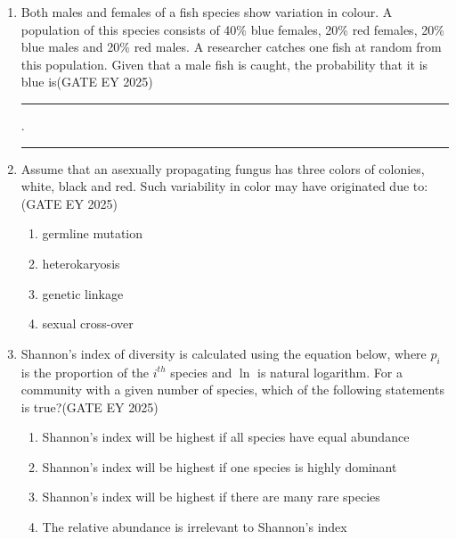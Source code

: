 \begin{enumerate}[leftmargin=*,label=\textbf{Q.\arabic*},resume]
\begin{multicols}{2}
\begin{enumerate}
\item In the absence of caterpillars, ants negatively affected plant performance
\item In the absence of ants, caterpillars positively affected plant performance
\item In the presence of caterpillars, ants negatively affected plant performance
\item In the presence of ants, caterpillars positively affected plant performance
\end{enumerate}
\end{multicols}

\item Both males and females of a fish species show variation in colour. A population of this species consists of 40\% blue females, 20\% red females, 20\% blue males and 20\% red males. A researcher catches one fish at random from this population. Given that a male fish is caught, the probability that it is blue is\hfill {(GATE EY 2025)} \rule{4cm}{0.15mm}.

\rule{4cm}{0.15mm}

\item Assume that an asexually propagating fungus has three colors of colonies, white, black and red. Such variability in color may have originated due to:\hfill {(GATE EY 2025)}
\begin{multicols}{2}
\begin{enumerate}
\item germline mutation
\item heterokaryosis
\item genetic linkage
\item sexual cross-over
\end{enumerate}
\end{multicols}

\item Shannon's index of diversity is calculated using the equation below, where $p_i$ is the proportion of the $i^{th}$ species and $\ln$ is natural logarithm. For a community with a given number of species, which of the following statements is true?\hfill {(GATE EY 2025)}
\begin{multicols}{2}
\begin{enumerate}
\item Shannon's index will be highest if all species have equal abundance
\item Shannon's index will be highest if one species is highly dominant
\item Shannon's index will be highest if there are many rare species
\item The relative abundance is irrelevant to Shannon's index
\end{enumerate}
\end{multicols}


\end{enumerate}
